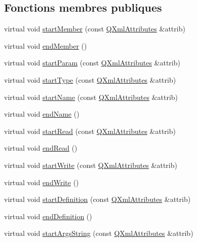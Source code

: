 \subsection*{Fonctions membres publiques}
\begin{DoxyCompactItemize}
\item 
virtual void \hyperlink{class_member_handler_ad6b8cc2d826d8ee3be294b368d50136b}{start\+Member} (const \hyperlink{class_q_xml_attributes}{Q\+Xml\+Attributes} \&attrib)
\item 
virtual void \hyperlink{class_member_handler_a77d45fe7d1739f1018c0916b077d61a8}{end\+Member} ()
\item 
virtual void \hyperlink{class_member_handler_acf75cf9bdba601949968d3ba7b9fdf0a}{start\+Param} (const \hyperlink{class_q_xml_attributes}{Q\+Xml\+Attributes} \&attrib)
\item 
virtual void \hyperlink{class_member_handler_ab3a68fb1fd9422903a7628e464c55040}{start\+Type} (const \hyperlink{class_q_xml_attributes}{Q\+Xml\+Attributes} \&attrib)
\item 
virtual void \hyperlink{class_member_handler_ac7f1e168ffe2238bd18cbd62b00c0537}{start\+Name} (const \hyperlink{class_q_xml_attributes}{Q\+Xml\+Attributes} \&attrib)
\item 
virtual void \hyperlink{class_member_handler_a39940bd40484323c0d92567be6ee7f57}{end\+Name} ()
\item 
virtual void \hyperlink{class_member_handler_a0bc96927d7fc108de2a7f6ffa8533aae}{start\+Read} (const \hyperlink{class_q_xml_attributes}{Q\+Xml\+Attributes} \&attrib)
\item 
virtual void \hyperlink{class_member_handler_ad65021d641eab752562fd807e02bf604}{end\+Read} ()
\item 
virtual void \hyperlink{class_member_handler_a01c2d1347b8aa86bde24ba4c583e8e1e}{start\+Write} (const \hyperlink{class_q_xml_attributes}{Q\+Xml\+Attributes} \&attrib)
\item 
virtual void \hyperlink{class_member_handler_a519015ed38bdcd6040547efca7216cdc}{end\+Write} ()
\item 
virtual void \hyperlink{class_member_handler_a0b51ae8bf755af4271ca2386fb575d5d}{start\+Definition} (const \hyperlink{class_q_xml_attributes}{Q\+Xml\+Attributes} \&attrib)
\item 
virtual void \hyperlink{class_member_handler_a24f695c3c4cbcdde30aca405df44dbe3}{end\+Definition} ()
\item 
virtual void \hyperlink{class_member_handler_a4256a8af700a6e5d1c4db24aa51cbb36}{start\+Args\+String} (const \hyperlink{class_q_xml_attributes}{Q\+Xml\+Attributes} \&attrib)

\end{DoxyCompactItemize}
